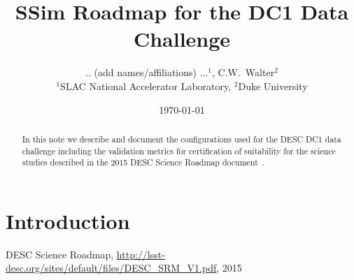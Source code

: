 \documentclass[12pt,letterpaper]{article}
\begin{document}

\title{SSim Roadmap for the DC1 Data Challenge}
\author{ .. (add names/affiliations) ...$^1$, C.W.~Walter$^2$ \\
{\small $^1$SLAC National Accelerator Laboratory, $^2$Duke University}}

\date{\today}

\maketitle

\begin{abstract}
  In this note we describe and document the configurations used for
  the DESC DC1 data challenge including the validation metrics for
  certification of suitability for the science studies described in
  the 2015 DESC Science Roadmap document~\cite{SRM:2015}.
\end{abstract}

\noindent
\begin{center}
  \fboxsep=5pt  
  \end{center} 
\vspace{0.1in}

\section{Introduction}


\begin{appendices}


\end{appendices}

\begin{thebibliography}{100}

DESC Science Roadmap,
\url{http://lsst-desc.org/sites/default/files/DESC_SRM_V1.pdf}, 2015

\end{thebibliography}
\end{document}
